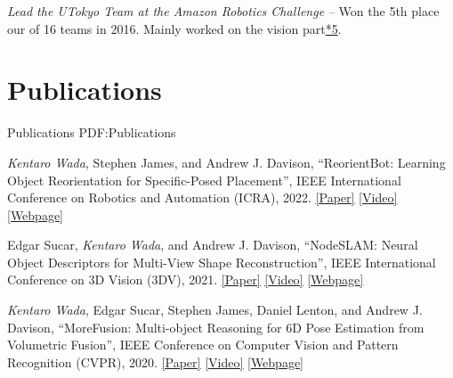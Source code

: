 \documentclass[letterpaper,MMMyyyy,nonstop]{simpleresumecv}
\begin{document}
\begin{body}
\BigGapNoBreak

\textit{Lead the UTokyo Team at the Amazon Robotics Challenge}
\hfill
{\it {} -- }
\newline
Won the 5th place our of 16 teams in 2016. Mainly worked on the vision part\href{https://github.com/start-jsk/jsk_apc}{*5}.




\section
{Publications}
{Publications}
{PDF:Publications}

\BulletItem
\textit{Kentaro Wada}, Stephen James, and Andrew J. Davison,
``ReorientBot: Learning Object Reorientation for Specific-Posed Placement'',
IEEE International Conference on Robotics and Automation (ICRA), 2022.
\href{https://arxiv.org/abs/2202.11092}{\underline{[Paper]}}
\href{https://youtu.be/ahWN84sWWJU}{\underline{[Video]}}
\href{https://reorientbot.wkentaro.com}{\underline{[Webpage]}}


\BulletItem
Edgar Sucar, \textit{Kentaro Wada}, and Andrew J. Davison,
``NodeSLAM: Neural Object Descriptors for Multi-View Shape Reconstruction'',
IEEE International Conference on 3D Vision (3DV), 2021.
\href{https://arxiv.org/abs/2004.04485}{\underline{[Paper]}}
\href{https://youtu.be/zPzMtXU-0JE}{\underline{[Video]}}
\href{https://edgarsucar.github.io/NodeSLAM/}{\underline{[Webpage]}}

\BulletItem
\textit{Kentaro Wada}, Edgar Sucar, Stephen James, Daniel Lenton, and Andrew J.
Davison,
``MoreFusion: Multi-object Reasoning for 6D Pose Estimation from Volumetric
Fusion'',
IEEE Conference on Computer Vision and Pattern Recognition (CVPR), 2020.
\href{https://arxiv.org/abs/2004.04336}{\underline{[Paper]}}
\href{https://youtu.be/6oLUhuZL4ko}{\underline{[Video]}}
\href{https://morefusion.wkentaro.com}{\underline{[Webpage]}}


\end{body}
\end{document}

